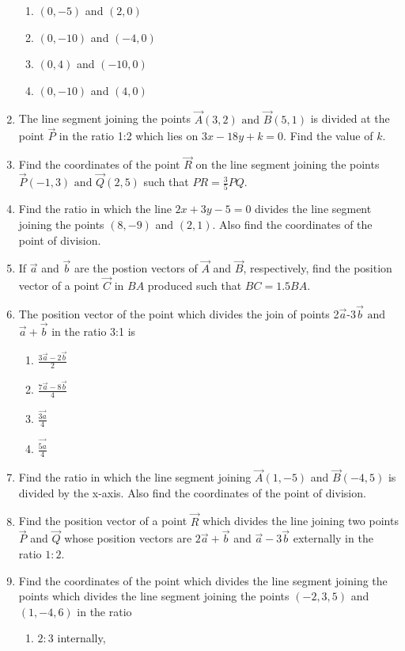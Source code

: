 \begin{enumerate}[label=\thesubsection.\arabic*,ref=\thesubsection.\theenumi]
\begin{enumerate}
	\item$(0,-5)$ and $(2,0)$
	\item$(0,-10)$ and $(-4,0)$
	\item$(0,4)$ and  $(-10,0)$
	\item$(0,-10)$ and $(4,0)$
\end{enumerate}
\item The line segment joining the points $\vec{A}(3,2)\text{ and }\vec{B}(5,1)$ is divided at the point $\vec{P}$ in the ratio 1:2 which lies on $3x-18y+k=0$. Find the value of $k$.  
\item Find the coordinates of the point $\vec{R}$ on the line segment joining the points $\vec{P}(-1,3)\text{ and }\vec{Q}(2,5)$ such that $PR=\frac{3}{5}PQ$.
\item Find the ratio in which the line $2x+3y-5=0$ divides the line segment joining the points $(8,-9)$ and $(2,1)$. Also find the coordinates of the point of division.
\item If $\vec{a}$ and $\vec{b}$ are the postion vectors of $\vec{A}$ and $\vec{B}$, respectively, find the position vector of a point $\vec{C}$ in $BA$ produced such that $BC=1.5BA$.
\item The position vector of the point which divides the join of points 2$\vec{a}$-3$\vec{b}$ $\text{and}$ $\vec{a}+\vec{b}$ in the ratio 3:1 is
	\begin{enumerate}
\item $\frac{3\vec{a}-2\vec{b}}{2}$
\item $\frac{7\vec{a}-8\vec{b}}{4}$
\item $\frac{\vec{3a}}{4}$
\item $\frac{\vec{5a}}{4}$
\end{enumerate}
\item Find the ratio in which the line segment joining $\vec{A}(1,-5)$  and  $\vec{B}(-4,5)$ is divided by the x-axis. Also find the coordinates of the point of division.
\item Find the position vector of a point $\vec{R}$ which divides the line joining two points $\vec{P}$ and $\vec{Q}$ whose position vectors are $2\vec{a}+\vec{b}$ and $\vec{a}-3\vec{b}$ externally in the ratio $1:2$.
\item Find the coordinates of the point which divides the line segment joining the points which divides the line segment joining  the points $(-2,3,5)$ and $(1,-4,6)$ in the ratio 
\begin{enumerate}
\item $2:3$ internally,

\end{enumerate}
\end{enumerate}
